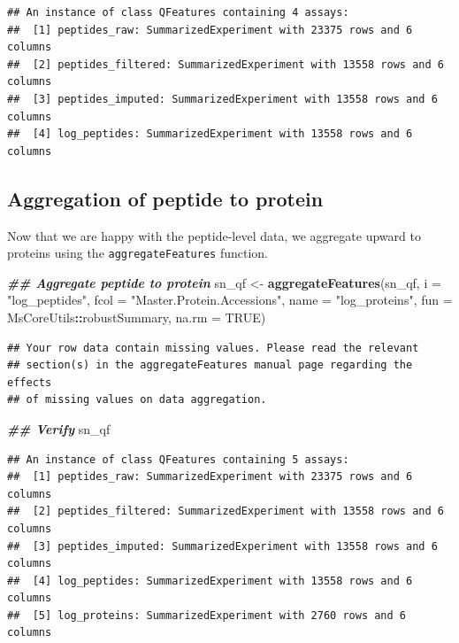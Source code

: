 \documentclass[9pt,a4paper,]{extarticle}
\newenvironment{Shaded}{\begin{snugshade}}{\end{snugshade}}
\newcommand{\AttributeTok}[1]{\textcolor[rgb]{0.13,0.29,0.53}{#1}}
\newcommand{\ConstantTok}[1]{\textcolor[rgb]{0.56,0.35,0.01}{#1}}
\newcommand{\DocumentationTok}[1]{\textcolor[rgb]{0.56,0.35,0.01}{\textbf{\textit{#1}}}}
\newcommand{\FunctionTok}[1]{\textcolor[rgb]{0.13,0.29,0.53}{\textbf{#1}}}
\newcommand{\NormalTok}[1]{#1}
\newcommand{\OtherTok}[1]{\textcolor[rgb]{0.56,0.35,0.01}{#1}}
\newcommand{\SpecialCharTok}[1]{\textcolor[rgb]{0.81,0.36,0.00}{\textbf{#1}}}
\newcommand{\StringTok}[1]{\textcolor[rgb]{0.31,0.60,0.02}{#1}}
\begin{document}
\begin{verbatim}
## An instance of class QFeatures containing 4 assays:
##  [1] peptides_raw: SummarizedExperiment with 23375 rows and 6 columns 
##  [2] peptides_filtered: SummarizedExperiment with 13558 rows and 6 columns 
##  [3] peptides_imputed: SummarizedExperiment with 13558 rows and 6 columns 
##  [4] log_peptides: SummarizedExperiment with 13558 rows and 6 columns
\end{verbatim}

\subsection{Aggregation of peptide to protein}\label{aggregation-of-peptide-to-protein}

Now that we are happy with the peptide-level data, we aggregate upward to
proteins using the \texttt{aggregateFeatures} function.

\begin{Shaded}
\begin{Highlighting}[]
\DocumentationTok{\#\# Aggregate peptide to protein}
\NormalTok{sn\_qf }\OtherTok{\textless{}{-}} \FunctionTok{aggregateFeatures}\NormalTok{(sn\_qf,}
                           \AttributeTok{i =} \StringTok{"log\_peptides"}\NormalTok{,}
                           \AttributeTok{fcol =} \StringTok{"Master.Protein.Accessions"}\NormalTok{,}
                           \AttributeTok{name =} \StringTok{"log\_proteins"}\NormalTok{,}
                           \AttributeTok{fun =}\NormalTok{ MsCoreUtils}\SpecialCharTok{::}\NormalTok{robustSummary,}
                           \AttributeTok{na.rm =} \ConstantTok{TRUE}\NormalTok{)}
\end{Highlighting}
\end{Shaded}

\begin{verbatim}
## Your row data contain missing values. Please read the relevant
## section(s) in the aggregateFeatures manual page regarding the effects
## of missing values on data aggregation.
\end{verbatim}

\begin{Shaded}
\begin{Highlighting}[]
\DocumentationTok{\#\# Verify}
\NormalTok{sn\_qf}
\end{Highlighting}
\end{Shaded}

\begin{verbatim}
## An instance of class QFeatures containing 5 assays:
##  [1] peptides_raw: SummarizedExperiment with 23375 rows and 6 columns 
##  [2] peptides_filtered: SummarizedExperiment with 13558 rows and 6 columns 
##  [3] peptides_imputed: SummarizedExperiment with 13558 rows and 6 columns 
##  [4] log_peptides: SummarizedExperiment with 13558 rows and 6 columns 
##  [5] log_proteins: SummarizedExperiment with 2760 rows and 6 columns
\end{verbatim}
\end{document}
